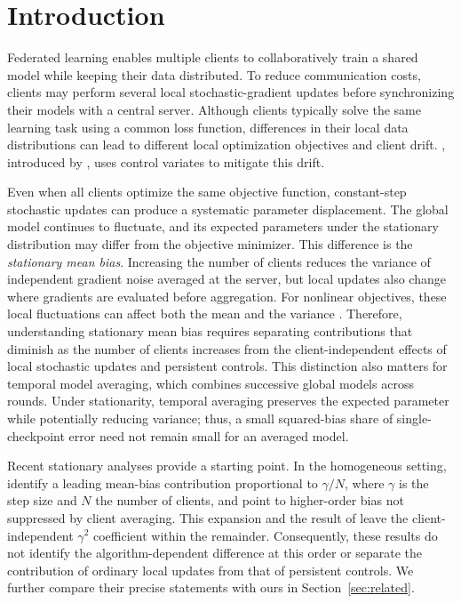 \section{Introduction}
\label{sec:introduction}

Federated learning enables multiple clients to collaboratively train a shared model while keeping their data distributed. To reduce communication costs, clients may perform several local stochastic-gradient updates before synchronizing their models with a central server. Although clients typically solve the same learning task using a common loss function, differences in their local data distributions can lead to different local optimization objectives and client drift. \Scaf{}, introduced by \citet{karimireddy2020scaffold}, uses control variates to mitigate this drift.

Even when all clients optimize the same objective function, constant-step stochastic updates can produce a systematic parameter displacement. The global model continues to fluctuate, and its expected parameters under the stationary distribution may differ from the objective minimizer. This difference is the \emph{stationary mean bias}. Increasing the number of clients reduces the variance of independent gradient noise averaged at the server, but local updates also change where gradients are evaluated before aggregation. For nonlinear objectives, these local fluctuations can affect both the mean and the variance \citep{glasgow2022sharp}. Therefore, understanding stationary mean bias requires separating contributions that diminish as the number of clients increases from the client-independent effects of local stochastic updates and persistent controls. This distinction also matters for temporal model averaging, which combines successive global models across rounds. Under stationarity, temporal averaging preserves the expected parameter while potentially reducing variance; thus, a small squared-bias share of single-checkpoint error need not remain small for an averaged model.

Recent stationary analyses provide a starting point. In the homogeneous setting, \citet[Theorem~5.3]{mangold2025scaffold} identify a leading \Scaf{} mean-bias contribution proportional to $\gamma/N$, where $\gamma$ is the step size and $N$ the number of clients, and point to higher-order bias not suppressed by client averaging. This expansion and the \FedAvg{} result of \citet[Theorem~3]{mangold2025fedavg} leave the client-independent $\gamma^2$ coefficient within the remainder. Consequently, these results do not identify the algorithm-dependent difference at this order or separate the contribution of ordinary local updates from that of persistent controls. We further compare their precise statements with ours in Section~\ref{sec:related}.


